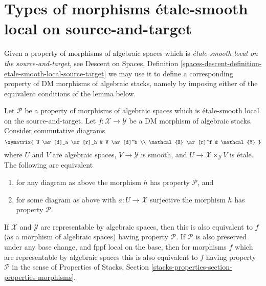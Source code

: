 \section{Types of morphisms \'etale-smooth local on source-and-target}
\label{section-etale-smooth-local-source-target}

\noindent
Given a property of morphisms of algebraic spaces which is
{\it \'etale-smooth local on the source-and-target}, see
Descent on Spaces,
Definition \ref{spaces-descent-definition-etale-smooth-local-source-target}
we may use it to define a corresponding
property of DM morphisms of algebraic stacks, namely by imposing either of
the equivalent conditions of the lemma below.

\begin{lemma}
\label{lemma-etale-smooth-local-source-target}
Let $\mathcal{P}$ be a property of morphisms of algebraic spaces
which is \'etale-smooth local on the source-and-target.
Let $f : \mathcal{X} \to \mathcal{Y}$ be a DM morphism of algebraic stacks.
Consider commutative diagrams
$$
\xymatrix{
U \ar[d]_a \ar[r]_h & V \ar[d]^b \\
\mathcal{X} \ar[r]^f & \mathcal{Y}
}
$$
where $U$ and $V$ are algebraic spaces, $V \to \mathcal{Y}$ is smooth,
and $U \to \mathcal{X} \times_\mathcal{Y} V$ is \'etale.
The following are equivalent
\begin{enumerate}
\item for any diagram as above the morphism $h$ has property $\mathcal{P}$, and
\item for some diagram as above with $a : U \to \mathcal{X}$ surjective
the morphism $h$ has property $\mathcal{P}$.
\end{enumerate}
If $\mathcal{X}$ and $\mathcal{Y}$ are representable by algebraic spaces,
then this is also equivalent to $f$ (as a morphism of algebraic spaces)
having property $\mathcal{P}$. If $\mathcal{P}$ is also preserved under
any base change, and fppf local on the base, then for morphisms $f$
which are representable by algebraic spaces this
is also equivalent to $f$ having property $\mathcal{P}$ in the sense
of
Properties of Stacks,
Section \ref{stacks-properties-section-properties-morphisms}.
\end{lemma}

